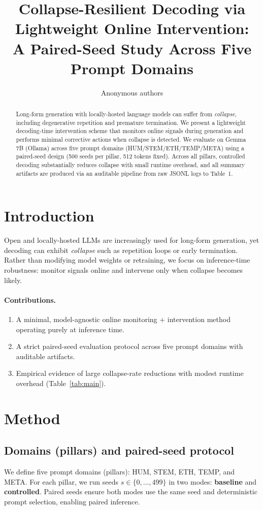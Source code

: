 \documentclass{article}
\title{Collapse-Resilient Decoding via Lightweight Online Intervention:%
\texorpdfstring{\\}{ }A Paired-Seed Study Across Five Prompt Domains}
\author{Anonymous authors}
\begin{document}
\maketitle

\begin{abstract}
Long-form generation with locally-hosted language models can suffer from \emph{collapse},
including degenerative repetition and premature termination.
We present a lightweight decoding-time intervention scheme that monitors online signals
during generation and performs minimal corrective actions when collapse is detected.
We evaluate on Gemma 7B (Ollama) across five prompt domains (HUM/STEM/ETH/TEMP/META)
using a paired-seed design (500 seeds per pillar, 512 tokens fixed).
Across all pillars, controlled decoding substantially reduces collapse with small runtime overhead,
and all summary artifacts are produced via an auditable pipeline from raw JSONL logs to Table~1.
\end{abstract}

\section{Introduction}
Open and locally-hosted LLMs are increasingly used for long-form generation,
yet decoding can exhibit \emph{collapse} such as repetition loops or early termination.
Rather than modifying model weights or retraining, we focus on inference-time robustness:
monitor signals online and intervene only when collapse becomes likely.

\paragraph{Contributions.}
\begin{enumerate}[leftmargin=*, itemsep=2pt]
\item A minimal, model-agnostic online monitoring + intervention method operating purely at inference time.
\item A strict paired-seed evaluation protocol across five prompt domains with auditable artifacts.
\item Empirical evidence of large collapse-rate reductions with modest runtime overhead (Table~\ref{tab:main}).
\end{enumerate}

\section{Method}
\subsection{Domains (pillars) and paired-seed protocol}
We define five prompt domains (pillars): HUM, STEM, ETH, TEMP, and META.
For each pillar, we run seeds $s \in \{0,\dots,499\}$ in two modes: \textbf{baseline} and \textbf{controlled}.
Paired seeds ensure both modes use the same seed and deterministic prompt selection, enabling paired inference.
\end{document}
